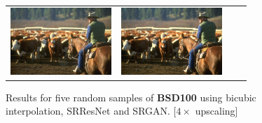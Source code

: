 \documentclass[10pt,twocolumn,letterpaper]{article}
\begin{document}
\begin{figure}[h!]
\begin{tabular}{cccc}
     	\includegraphics[width=1.5in]{images/used/appendix/jpg/BSD100/220075_SRGAN-VGG54} &
     	\includegraphics[width=1.5in]{images/used/appendix/jpg/BSD100/220075_HR} \\     	
  	\end{tabular}
  	\label{fig:app_BSD100}
  	\caption{Results for five random samples of \textbf{BSD100} using bicubic interpolation, SRResNet and SRGAN. [$4\times$ upscaling]} 
\end{figure}
\end{document}
